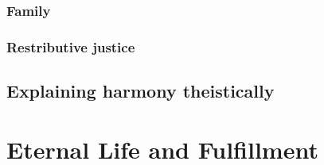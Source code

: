 \subsection{Family}
\subsection{Restributive justice}

\section{Explaining harmony theistically}
\chaptertail

\def\mychapter{X}

\chapter{Eternal Life and Fulfillment}\label{ch:eternal-life}
\chaptertail

